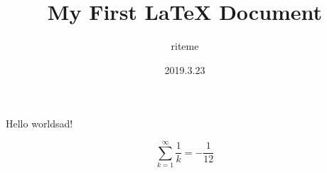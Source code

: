 \documentclass{article}
\title{My First LaTeX Document}
\date{2019.3.23}
\author{riteme}
\begin{document}
    \maketitle
    \newpage

    Hello worldsad!

    $$ \sum_{k = 1}^\infty \frac1k = -\frac1{12} $$
\end{document}

